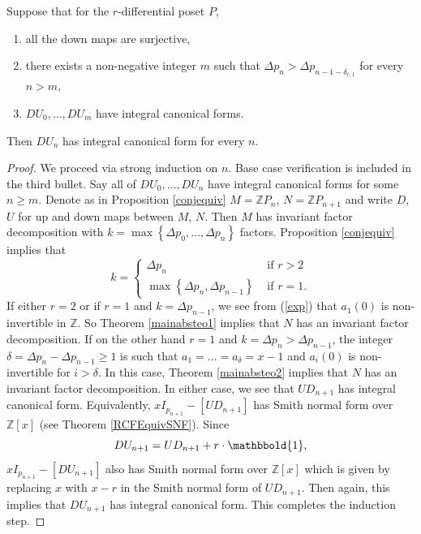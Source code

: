 \documentclass[ALCO, Unicode]{cedram}
\newcommand{\ZZ}{\mathbb{Z}}
\begin{document}
 
 \begin{theorem}  \label{mainteo} Suppose that  for the $ r $-differential poset  $  P  $, 
\begin{enumerate}[itemsep=0.1em]   
\item[$\bullet$]
all the down maps  are surjective,    
\item[$\bullet$]
there exists a non-negative integer $ m  $ such that   $   \Delta   p_{n}     >  \Delta p_{n-1 - \delta_{r,1}}  
 $ for every $ n > m   $, 
\item[$\bullet$] $ DU_{0}, \ldots, DU_{m}  $ have    integral canonical forms.  \end{enumerate}              
Then $ DU_{n}  $ has integral canonical   form  for  every  $   n $.                       
\end{theorem} 
\begin{proof}  We  proceed via strong induction 
on $ n $. Base case verification is included in the third bullet. Say all of $  DU_{0}, \ldots, DU_{n} $  have integral canonical forms for some $ n \geq  m  $.   Denote as in Proposition \ref{conjequiv}  $ M = \ZZ P_{n} $, $ N = \ZZ P_{n+1}  $ and write  $ D $, $ U $ for up and down maps between $ M $, $ N $. Then $ M $ has invariant factor decomposition with $ k = \max \left \{ \Delta p_{0}, \ldots, \Delta p_{n} \right \} $ factors. Proposition \ref{conjequiv} implies that $$ k = \begin{cases}   \Delta p_{n} & \text{ if }  r > 2 \\ \max \left \{ \Delta p_{n} , \Delta p_{n-1}  \right \}  & \text{ if } r = 1 . \end{cases} $$
  If either $ r = 2 $ or if $ r =1 $ and $ k = \Delta p_{n-1}  $, we see from (\ref{exp}) that $ a_{1}(0) $ is non-invertible in $ \ZZ $. So Theorem \ref{mainabsteo1}  implies   that $ N $ has an invariant factor  decomposition. If on the other hand 
  $ r = 1  $ and  $ k = \Delta p_{n}  > \Delta p_{n-1} $,  the integer $ \delta =  \Delta p_{n} - \Delta p_{n-1} \geq 1 $ is such that $ a_{1} = \ldots = a_{\delta} = x- 1 $ and $ a_{i}(0) $ is non-invertible for $ i > \delta $. In this case, Theorem \ref{mainabsteo2} implies that  $  N $ has an invariant factor decomposition. 
In either case, we see that  $  UD_{n+1} $ has integral canonical form. Equivalently, $  xI_{p_{n+1}}  - [UD_{n+1}] $ has Smith normal form over $ \ZZ[x] $ (see    Theorem \ref{RCFEquivSNF}).  Since $$ DU_{n+1} = UD_{n+1}  +  r   \cdot     \mathbbold{1} ,  $$   $ xI_{p_{n+1}} - [DU_{n+1}] $ also has Smith normal form over $ \ZZ[x] $ which is given by replacing $ x $ with $ x - r $ in the Smith normal form of $ UD_{n+1} $. Then again, this implies that $ DU_{n+1} $ has integral canonical form.  This completes the induction step. 
\end{proof}   
\end{document}
